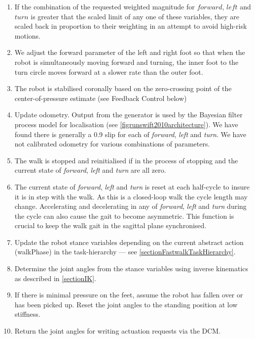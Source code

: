 \documentclass[pdftex,11pt,a4paper]{report}
\begin{document}
\begin{enumerate}
\item If the combination of the requested weighted magnitude for $forward$, $left$ and $turn$ is greater that the scaled limit of any one of these variables, they are scaled back in proportion to their weighting in an attempt to avoid high-risk motions.
\item We adjust the forward parameter of the left and right foot so that when the robot is simultaneously moving forward and turning, the inner foot to the turn circle moves forward at a slower rate than the outer foot. 
\item The robot is stabilised coronally based on the zero-crossing point of the center-of-pressure estimate (see Feedback Control below)
\item Update odometry. Output from the generator is used by the Bayesian filter process model for localisation (see \autoref{figrunswift2010architecture}). We have found there is generally a 0.9 slip for each of \emph{forward}, \emph{left} and \emph{turn}. We have not calibrated odometry for various combinations of parameters.
\item The walk is stopped and reinitialised if in the process of stopping and the current state of \emph{forward}, \emph{left} and \emph{turn} are all zero.
\item The current state of \emph{forward}, \emph{left} and \emph{turn} is reset at each half-cycle to insure it is in step with the walk. As this is a closed-loop walk the cycle length may change. Accelerating and decelerating in any of \emph{forward}, \emph{left} and \emph{turn} during the cycle can also cause the gait to become asymmetric. This function is crucial to keep the walk gait in the sagittal plane synchronised.
\item Update the robot stance variables depending on the current abstract action (walkPhase) in the task-hierarchy --- see \autoref{sectionFastwalkTaskHierarchy}.
\item Determine the joint angles from the stance variables using inverse kinematics as described in \autoref{sectionIK}.  
\item If there is minimal pressure on the feet, assume the robot has fallen over or has been picked up. Reset the joint angles to the standing position at low stiffness. 
\item Return the joint angles for writing actuation requests via the DCM.
\end{enumerate}
\end{document}
